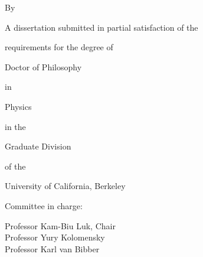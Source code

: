 \begin{center}
  \MyTitle
  
  \vspace{2\baselineskip} By %

  \vspace{\baselineskip} \MyAuthor

  \vspace{2\baselineskip}

  A dissertation submitted in partial satisfaction of the
  \par\vspace{\baselineskip} requirements for the degree of
  \par\vspace{\baselineskip} Doctor of Philosophy
  \par\vspace{\baselineskip} in
  \par\vspace{\baselineskip} Physics
  \par\vspace{\baselineskip} in the
  \par\vspace{\baselineskip} Graduate Division
  \par\vspace{\baselineskip} of the
  \par\vspace{\baselineskip} University of California, Berkeley

  \vfill\SingleSpacing\frontsize

  Committee in charge:
  \par\vspace{\baselineskip}
  Professor Kam-Biu Luk, Chair\\
  Professor Yury Kolomensky\\
  Professor Karl van Bibber

  \vspace{2\baselineskip} \MyDate
\end{center}

\clearpage
